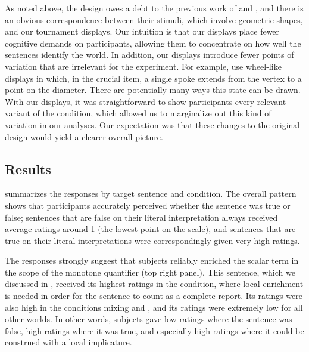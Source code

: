 \documentclass[leqno]{article}
\begin{document}
As noted above, the design owes a debt to the previous work of
\citet{Geurts:Pouscoulous:2009} and \citet{Chemla:Spector:2011}, and
there is an obvious correspondence between their stimuli, which
involve geometric shapes, and our tournament displays. Our intuition
is that our displays place fewer cognitive demands on participants,
allowing them to concentrate on how well the sentences identify the
world. In addition, our displays introduce fewer points of variation
that are irrelevant for the experiment. For example,
\citet{Chemla:Spector:2011} use wheel-like displays in which, in the
crucial item, a single spoke extends from the vertex to a point on the
diameter. There are potentially many ways this state can be
drawn. With our displays, it was straightforward to show participants
every relevant variant of the condition, which allowed us to
marginalize out this kind of variation in our analyses. Our
expectation was that these changes to the original design would yield
a clearer overall picture.


\subsection{Results}\label{sec:exp1:results}

 summarizes the responses by target sentence
and condition. The overall pattern shows that participants accurately
perceived whether the sentence was true or false; sentences that are
false on their literal interpretation always received average ratings
around 1 (the lowest point on the scale), and sentences that are true
on their literal interpretations were correspondingly given very high
ratings.

The responses strongly suggest that subjects reliably enriched the
scalar term in the scope of the monotone quantifier  (top right panel). This sentence, which we discussed in
, received its highest ratings in the
 condition, where local enrichment is needed in order for
the sentence to count as a complete report. Its ratings were also high
in the conditions mixing  and , and its ratings were
extremely low for all other worlds. In other words, subjects gave low
ratings where the sentence was false, high ratings where it was true,
and especially high ratings where it could be construed with a local
implicature.
\end{document}
